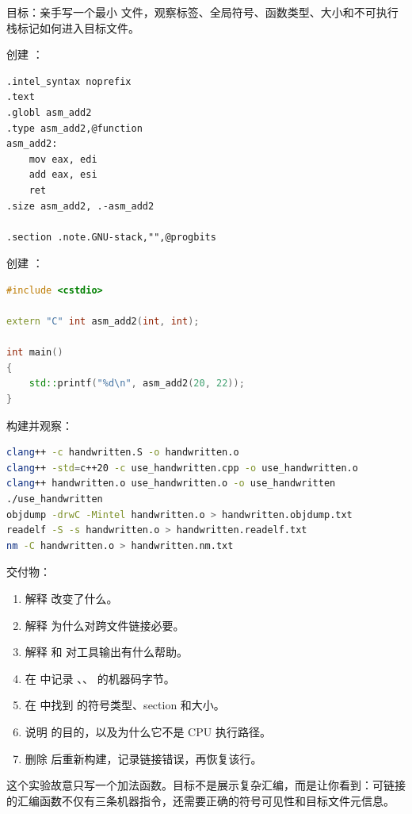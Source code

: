 \begin{labbox}
目标：亲手写一个最小  文件，观察标签、全局符号、函数类型、大小和不可执行栈标记如何进入目标文件。

创建 ：

\begin{lstlisting}
.intel_syntax noprefix
.text
.globl asm_add2
.type asm_add2,@function
asm_add2:
    mov eax, edi
    add eax, esi
    ret
.size asm_add2, .-asm_add2

.section .note.GNU-stack,"",@progbits
\end{lstlisting}

创建 ：

\begin{lstlisting}[language=C++]
#include <cstdio>

extern "C" int asm_add2(int, int);

int main()
{
    std::printf("%d\n", asm_add2(20, 22));
}
\end{lstlisting}

构建并观察：

\begin{lstlisting}[language=bash]
clang++ -c handwritten.S -o handwritten.o
clang++ -std=c++20 -c use_handwritten.cpp -o use_handwritten.o
clang++ handwritten.o use_handwritten.o -o use_handwritten
./use_handwritten
objdump -drwC -Mintel handwritten.o > handwritten.objdump.txt
readelf -S -s handwritten.o > handwritten.readelf.txt
nm -C handwritten.o > handwritten.nm.txt
\end{lstlisting}

交付物：

\begin{enumerate}
  \item 解释  改变了什么。
  \item 解释  为什么对跨文件链接必要。
  \item 解释  和  对工具输出有什么帮助。
  \item 在  中记录 、、 的机器码字节。
  \item 在  中找到  的符号类型、section 和大小。
  \item 说明  的目的，以及为什么它不是 CPU 执行路径。
  \item 删除  后重新构建，记录链接错误，再恢复该行。
\end{enumerate}

这个实验故意只写一个加法函数。目标不是展示复杂汇编，而是让你看到：可链接的汇编函数不仅有三条机器指令，还需要正确的符号可见性和目标文件元信息。
\end{labbox}

